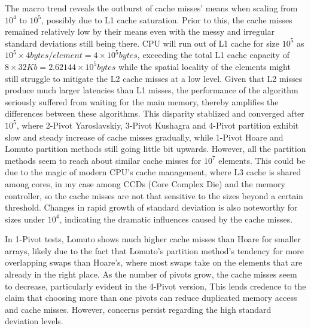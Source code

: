 \documentclass[a4paper,oneside,12pt]{book}
\begin{document}
The macro trend reveals the outburst of cache misses' means when scaling from $10^4$ to $10^5$, possibly due to L1 cache saturation.
Prior to this, the cache misses remained relatively low by their means even with the messy and irregular standard deviations still being there.
CPU will run out of L1 cache for size $10^5$ as $10^5 \times 4 {bytes} / element = 4 \times 10^5 {bytes}$, exceeding the total L1 cache capacity of $8 \times 32Kb = 2.62144 \times 10^5 bytes$ while the spatial locality of the elements might still struggle to mitigate the L2 cache misses at a low level.
Given that L2 misses produce much larger latencies than L1 misses, the performance of the algorithm seriously suffered from waiting for the main memory, thereby amplifies the differences between these algorithms. This disparity stablized and converged after $10^5$, where 2-Pivot Yaroslavskiy, 3-Pivot Kushagra and 4-Pivot partition
exhibit slow and steady increase of cache misses gradually, while 1-Pivot Hoare and Lomuto partition methods still going little bit upwards. However, all the partition methods seem to reach about similar cache misses for $10^7$ elements. This could be due to the magic of modern CPU's cache management, where L3 cache is shared among cores,
in my case among CCDs (Core Complex Die) and the memory controller, so the cache misses are not that sensitive to the sizes beyond a certain threshold.
Changes in rapid growth of standard deviation is also noteworthy for sizes under $10^4$, indicating the dramatic influences caused by the cache misses.

In 1-Pivot tests, Lomuto shows much higher cache misses than Hoare for smaller arrays, likely due to the fact that Lomuto's partition method's tendency for more overlapping swaps than Hoare's,
where most swaps take on the elements that are already in the right place. As the number of pivots grow, the cache misses seem to decrease, particularly evident in the 4-Pivot version,
This lends credence to the claim that choosing more than one pivots can reduce duplicated memory access and cache misses. However, concerns persist regarding the high standard deviation levels.
\end{document}
